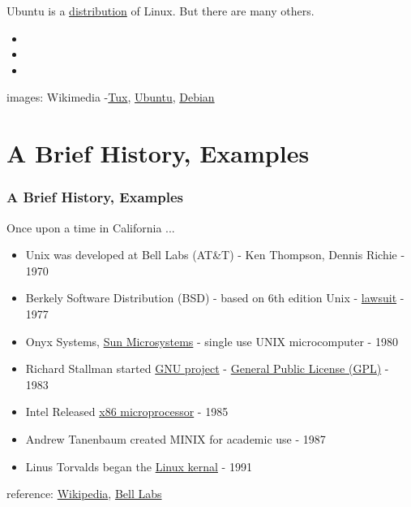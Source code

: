 \documentclass[fleqn]{beamer} %
\newcommand{\sectiontitleII}{A Brief History, Examples}
\begin{document}
\begin{frame}
			Ubuntu is a \href{https://en.wikipedia.org/wiki/Linux_distribution}{distribution} of Linux. But there are many others. 
            \begin{itemize}
                \item 
                \item 
                \item 
            \end{itemize} 

            \btVFill
            {\tiny images: Wikimedia -\href{https://commons.wikimedia.org/w/index.php?curid=753970}{Tux}, \href{https://commons.wikimedia.org/wiki/File:UbuntuCoF.svg}{Ubuntu}, \href{https://commons.wikimedia.org/wiki/File:Debian_logo.png}{Debian}} 
	\end{frame}
		
\section{\sectiontitleII}	

	\begin{frame}[label=sectionII] \footnotesize
		\frametitle{\sectiontitleII}
			Once upon a time in California ...\vspc
            \begin{itemize}
                \item Unix was developed at Bell Labs (AT\&T) - Ken Thompson,  Dennis Richie - 1970 
                \item Berkely Software Distribution (BSD) - based on 6th edition Unix - \href{https://en.wikipedia.org/wiki/UNIX_System_Laboratories,_Inc._v._Berkeley_Software_Design,_Inc.}{lawsuit} - 1977
                \item Onyx Systems, \href{https://en.wikipedia.org/wiki/Sun_Microsystems}{Sun Microsystems} - single use UNIX microcomputer - 1980
                \item Richard Stallman started \href{https://en.wikipedia.org/wiki/GNU_Project}{GNU project} - \href{https://en.wikipedia.org/wiki/GNU_General_Public_License}{General Public License (GPL)} - 1983
                \item Intel Released \href{https://en.wikipedia.org/wiki/X86}{x86 microprocessor} - 1985
                \item Andrew Tanenbaum created MINIX for academic use - 1987
                \item Linus Torvalds began the \href{https://en.wikipedia.org/wiki/Linux_kernel}{Linux kernal} - 1991 

            \end{itemize} 
		
		\btVFill
    	\tiny{reference: \href{https://en.wikipedia.org/wiki/History_of_Linux}{Wikipedia}, \href{https://www.bell-labs.com/var/articles/invention-unix/}{Bell Labs}}	
            
	\end{frame}
\end{document}
